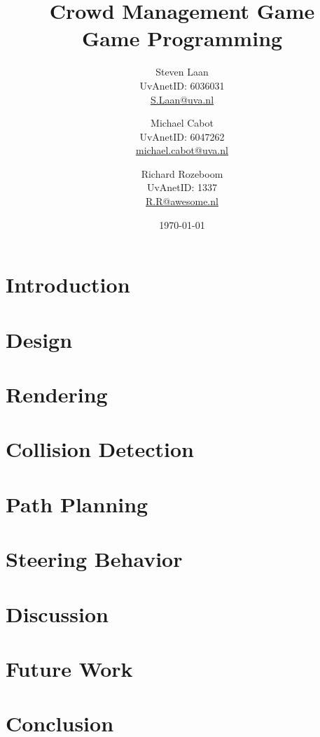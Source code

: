 \documentclass[a4paper,pdf,12pt]{article}
\title{Crowd Management Game\\ \normalsize{Game Programming}}
\author{Steven Laan\\UvAnetID: 6036031\\\url{S.Laan@uva.nl} \and Michael Cabot\\UvAnetID: 6047262\\\url{michael.cabot@uva.nl} \and Richard Rozeboom\\UvAnetID: 1337\\\url{R.R@awesome.nl}}
\date{\today}
\begin{document}
\maketitle

\section{Introduction}


\section{Design}
\label{sec:Design}

\section{Rendering}
\label{sec:Rendering}

\section{Collision Detection}
\label{sec:Collision Detection}

\section{Path Planning}
\label{sec:Path Planning}

\section{Steering Behavior}
\label{sec:Steering Behavior}

\section{Discussion}
\label{sec:Discussion}

\section{Future Work}
\label{sec:Future Work}

\section{Conclusion}
\label{sec:Conclusion}



\end{document}
